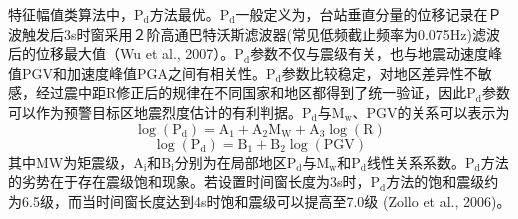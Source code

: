  \indent 特征幅值类算法中，$\mathrm{P}_{\mathrm{d}}$方法最优。$\mathrm{P}_{\mathrm{d}}$一般定义为，台站垂直分量的位移记录在Ｐ波触发后3s时窗采用２阶高通巴特沃斯滤波器(常见低频截止频率为0.075Hz)滤波后的位移最大值（Wu et al., 2007）。$\mathrm{P}_{\mathrm{d}}$参数不仅与震级有关，也与地震动速度峰值PGV和加速度峰值PGA之间有相关性。$\mathrm{P}_{\mathrm{d}}$参数比较稳定，对地区差异性不敏感，经过震中距R修正后的规律在不同国家和地区都得到了统一验证，因此$\mathrm{P}_{\mathrm{d}}$参数可以作为预警目标区地震烈度估计的有利判据。$\mathrm{P}_{\mathrm{d}}$与$\mathrm{M}_{\mathrm{w}}$、PGV的关系可以表示为
\begin{equation}
\log \left(\mathrm{P}_{\mathrm{d}}\right)=\mathrm{A}_{1}+\mathrm{A}_{2} \mathrm{M}_{\mathrm{W}}+\mathrm{A}_{3} \log (\mathrm{R})
\end{equation}
 \begin{equation}
\log \left(\mathrm{P}_{\mathrm{d}}\right)=\mathrm{B}_{1}+\mathrm{B}_{2} \log (\mathrm{PGV})
\end{equation}
 其中MW为矩震级，$\mathrm{A}_{\mathrm{i}}$和$\mathrm{B}_{\mathrm{i}}$分别为在局部地区$\mathrm{P}_{\mathrm{d}}$与$\mathrm{M}_{\mathrm{w}}$和$\mathrm{P}_{\mathrm{d}}$线性关系系数。$\mathrm{P}_{\mathrm{d}}$方法的劣势在于存在震级饱和现象。若设置时间窗长度为3s时，$\mathrm{P}_{\mathrm{d}}$方法的饱和震级约为6.5级，而当时间窗长度达到4s时饱和震级可以提高至7.0级 (Zollo et al., 2006)。
 

 
 